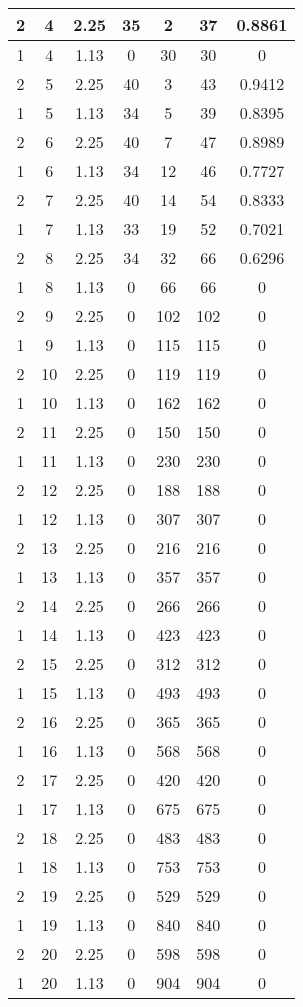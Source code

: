 \documentclass[letterpaper, 12pt]{article}
\begin{document}
\begin{longtable}{|c|c|c|c|c|c|c|}
\hline
2 & 4 & 2.25 & 35 & 2 & 37 & 0.8861 \\
\hline
1 & 4 & 1.13 & 0 & 30 & 30 & 0 \\
\hline
2 & 5 & 2.25 & 40 & 3 & 43 & 0.9412 \\
\hline
1 & 5 & 1.13 & 34 & 5 & 39 & 0.8395 \\
\hline
2 & 6 & 2.25 & 40 & 7 & 47 & 0.8989 \\
\hline
1 & 6 & 1.13 & 34 & 12 & 46 & 0.7727 \\
\hline
2 & 7 & 2.25 & 40 & 14 & 54 & 0.8333 \\
\hline
1 & 7 & 1.13 & 33 & 19 & 52 & 0.7021 \\
\hline
2 & 8 & 2.25 & 34 & 32 & 66 & 0.6296 \\
\hline
1 & 8 & 1.13 & 0 & 66 & 66 & 0 \\
\hline
2 & 9 & 2.25 & 0 & 102 & 102 & 0 \\
\hline
1 & 9 & 1.13 & 0 & 115 & 115 & 0 \\
\hline
2 & 10 & 2.25 & 0 & 119 & 119 & 0 \\
\hline
1 & 10 & 1.13 & 0 & 162 & 162 & 0 \\
\hline
2 & 11 & 2.25 & 0 & 150 & 150 & 0 \\
\hline
1 & 11 & 1.13 & 0 & 230 & 230 & 0 \\
\hline
2 & 12 & 2.25 & 0 & 188 & 188 & 0 \\
\hline
1 & 12 & 1.13 & 0 & 307 & 307 & 0 \\
\hline
2 & 13 & 2.25 & 0 & 216 & 216 & 0 \\
\hline
1 & 13 & 1.13 & 0 & 357 & 357 & 0 \\
\hline
2 & 14 & 2.25 & 0 & 266 & 266 & 0 \\
\hline
1 & 14 & 1.13 & 0 & 423 & 423 & 0 \\
\hline
2 & 15 & 2.25 & 0 & 312 & 312 & 0 \\
\hline
1 & 15 & 1.13 & 0 & 493 & 493 & 0 \\
\hline
2 & 16 & 2.25 & 0 & 365 & 365 & 0 \\
\hline
1 & 16 & 1.13 & 0 & 568 & 568 & 0 \\
\hline
2 & 17 & 2.25 & 0 & 420 & 420 & 0 \\
\hline
1 & 17 & 1.13 & 0 & 675 & 675 & 0 \\
\hline
2 & 18 & 2.25 & 0 & 483 & 483 & 0 \\
\hline
1 & 18 & 1.13 & 0 & 753 & 753 & 0 \\
\hline
2 & 19 & 2.25 & 0 & 529 & 529 & 0 \\
\hline
1 & 19 & 1.13 & 0 & 840 & 840 & 0 \\
\hline
2 & 20 & 2.25 & 0 & 598 & 598 & 0 \\
\hline
1 & 20 & 1.13 & 0 & 904 & 904 & 0 \\
\hline
\end{longtable}
\end{document}
